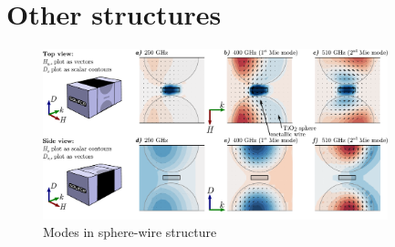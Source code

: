 \section{Other structures} %
\begin{figure} \caption{Modes in sphere-wire structure}  \centering \includegraphics[width=10cm]{img/new/modes_Mag_and_El.pdf} \end{figure} \clearpage
\subsection{} %
\subsection{} %
\subsection{} %
\subsection{} %
\subsection{} %
